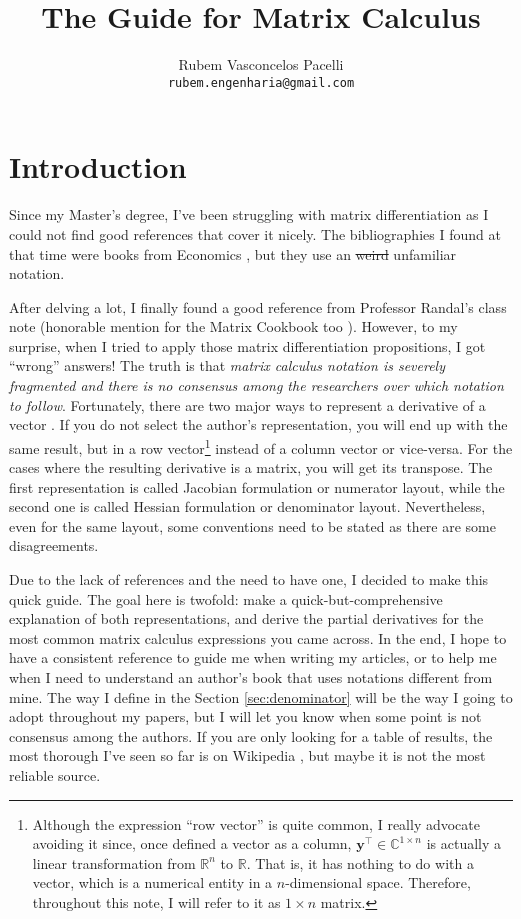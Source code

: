 \documentclass{article}
\title{\textbf{The Guide for Matrix Calculus}  \vspace{-.3cm}}
\author{Rubem Vasconcelos Pacelli\\
  {\tt rubem.engenharia@gmail.com}}
\affil{Department of Teleinformatics Engineering, Federal University of Ceará.\\Fortaleza, Ceará, Brazil. \vspace{-.5cm}}
\newcommand{\trans}{\top}
\begin{document}
\maketitle
\tableofcontents
\newpage
\section{Introduction}
Since my Master's degree, I've been struggling with matrix differentiation as I could not find good references that cover it nicely. The bibliographies I found at that time were books from Economics \cite{dhrymes1978mathematics}, but they use an \st{weird} unfamiliar notation.

After delving a lot, I finally found a good reference from Professor Randal's class note \cite{barnes2006matrix} (honorable mention for the Matrix Cookbook too \cite{petersen2008matrix}). However, to my surprise, when I tried to apply those matrix differentiation propositions, I got ``wrong'' answers! The truth is that \emph{matrix calculus notation is severely fragmented and there is no consensus among the researchers over which notation to follow}. Fortunately, there are two major ways to represent a derivative of a vector \cite{Singh}. If you do not select the author's representation, you will end up with the same result, but in a row vector\footnote{Although the expression ``row vector'' is quite common, I really advocate avoiding it since, once defined a vector as a column, \(\mathbf{y}^{\trans} \in \mathbb{C}^{1\times n}\) is actually a linear transformation from \(\mathbb{R}^{n}\) to \(\mathbb{R}\). That is, it has nothing to do with a vector, which is a numerical entity in a \(n\)-dimensional space. Therefore, throughout this note, I will refer to it as \(1\times n\) matrix.} instead of a column vector or vice-versa. For the cases where the resulting derivative is a matrix, you will get its transpose. The first representation is called Jacobian formulation or numerator layout, while the second one is called Hessian formulation or denominator layout. Nevertheless, even for the same layout, some conventions need to be stated as there are some disagreements.

Due to the lack of references and the need to have one, I decided to make this quick guide. The goal here is twofold: make a quick-but-comprehensive explanation of both representations, and derive the partial derivatives for the most common matrix calculus expressions you came across. In the end, I hope to have a consistent reference to guide me when writing my articles, or to help me when I need to understand an author's book that uses notations different from mine. The way I define in the Section \ref{sec:denominator} will be the way I going to adopt throughout my papers, but I will let you know when some point is not consensus among the authors. If you are only looking for a table of results, the most thorough I've seen so far is on Wikipedia \cite{Matrixca44:online}, but maybe it is not the most reliable source.
\end{document}
